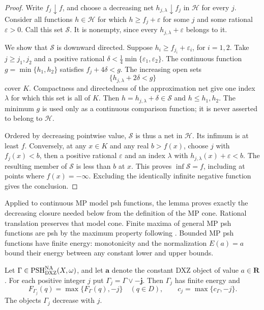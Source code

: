 \begin{proof}
Write \(f_j\downarrow f\), and choose a decreasing net
\(h_{j,\lambda}\downarrow f_j\) in \(\mathcal H\) for every \(j\).
Consider all functions \(h\in\mathcal H\) for which
\(h\geq f_j+\varepsilon\) for some \(j\) and some rational
\(\varepsilon>0\). Call this set \(\mathcal S\).
It is nonempty, since every \(h_{j,\lambda}+\varepsilon\) belongs to it.

We show that \(\mathcal S\) is downward directed. Suppose
\(h_i\geq f_{j_i}+\varepsilon_i\), for \(i=1,2\).
Take \(j\geq j_1,j_2\) and a positive rational
\(\delta<\frac14\min\{\varepsilon_1,\varepsilon_2\}\).
The continuous function \(g=\min\{h_1,h_2\}\) satisfies
\(f_j+4\delta<g\). The increasing open sets
\[
                  \{h_{j,\lambda}+2\delta<g\}
\]
cover \(K\). Compactness and directedness of the approximation net
give one index \(\lambda\) for which this set is all of \(K\).
Then \(h=h_{j,\lambda}+\delta\in\mathcal S\) and
\(h\leq h_1,h_2\). The minimum \(g\) is used only as a continuous
comparison function; it is never asserted to belong to \(\mathcal H\).

Ordered by decreasing pointwise value, \(\mathcal S\) is thus a net
in \(\mathcal H\). Its infimum is at least \(f\).
Conversely, at any \(x\in K\) and any real \(b>f(x)\), choose \(j\)
with \(f_j(x)<b\), then a positive rational \(\varepsilon\) and an
index \(\lambda\) with \(h_{j,\lambda}(x)+\varepsilon<b\).
The resulting member of \(\mathcal S\) is less than \(b\) at \(x\).
This proves \(\inf\mathcal S=f\), including at points where
\(f(x)=-\infty\). Excluding the identically infinite negative function
gives the conclusion.
\end{proof}

Applied to continuous MP model psh functions, the lemma proves exactly
the decreasing closure needed below from the definition of the MP cone.
Rational translation preserves that model cone. Finite maxima of general
MP psh functions are psh by the maximum property following
\cite[Definition~4.3.1]{MP24}. Bounded MP psh functions have finite energy:
monotonicity and the normalization \(E(a)=a\) bound their energy between
any constant lower and upper bounds.

\begin{lemma}\label{lem:p143k-dxz-truncation}
Let \(\Gamma\in\operatorname{PSH}^{\mathrm{NA}}_{\mathrm{DXZ}}(X,\omega)\), and let
\(\mathbf a\) denote the constant DXZ object of value \(a\in\mathbf R\).
For each positive integer \(j\) put
\(\Gamma_j=\Gamma\vee\mathbf{-j}\).
Then \(\Gamma_j\) has finite energy and
\begin{equation}\label{eq:p143k-divisorial-truncation}
 F_{\Gamma_j}(q)=\max\{F_\Gamma(q),-j\}\quad(q\in D),\qquad
 c_j=\max\{c_\Gamma,-j\}.
\end{equation}
The objects \(\Gamma_j\) decrease with \(j\).
\end{lemma}

